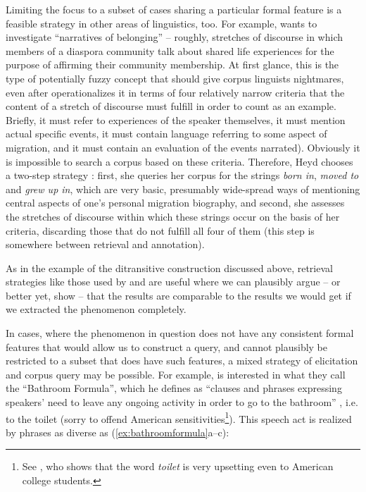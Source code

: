 Limiting the focus to a subset of cases sharing a particular formal feature is a feasible strategy in other areas of linguistics, too. For example, \citet{heyd_narratives_2016} wants to investigate ``narratives of belonging'' -- roughly, stretches of discourse in which members of a diaspora community talk about shared life experiences for the purpose of affirming their community membership. At first glance, this is the type of potentially fuzzy concept that should give corpus linguists nightmares, even after \citet[292]{heyd_narratives_2016} operationalizes it in terms of four relatively narrow criteria that the content of a stretch of discourse must fulfill in order to count as an example. Briefly, it must refer to experiences of the speaker themselves, it must mention actual specific events, it must contain language referring to some aspect of migration, and it must contain an evaluation of the events narrated). Obviously it is impossible to search a corpus based on these criteria. Therefore, Heyd chooses a two-step strategy \citep[294]{heyd_narratives_2016}: first, she queries her corpus for the strings \emph{born in}, \emph{moved to} and \emph{grew up in}, which are very basic, presumably wide-spread ways of mentioning central aspects of one's personal migration biography, and second, she assesses the stretches of discourse within which these strings occur on the basis of her criteria, discarding those that do not fulfill all four of them (this step is somewhere between retrieval and annotation).

As in the example of the ditransitive construction discussed above, retrieval strategies like those used by \citet{stefanowitsch_words_2006} and \citet{heyd_narratives_2016} are useful where we can plausibly argue -- or better yet, show -- that the results are comparable to the results we would get if we extracted the phenomenon completely.

In cases, where the phenomenon in question does not have any consistent formal features that would allow us to construct a query, and cannot plausibly be restricted to a subset that does have such features, a mixed strategy of elicitation and corpus query may be possible. For example, \citet{levin_bathroom_2014} is interested in what they call the ``Bathroom Formula'', which he defines as ``clauses and phrases expressing speakers' need to leave any ongoing activity in order to go to the bathroom'' \citet[2]{levin_bathroom_2014}, i.e. to the toilet (sorry to offend American sensitivities\footnote{See \citet{manning_words_1974}, who shows that the word \textit{toilet} is very upsetting even to American college students.}). This speech act is realized by phrases as diverse as (\ref{ex:bathroomformula}a--c):

